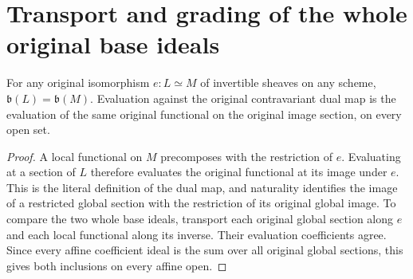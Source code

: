 \section{Transport and grading of the whole original base ideals}

\begin{lemma}
\label{lem:actual-base-ideal-iso-transport}
For any original isomorphism $e:L\simeq M$ of invertible sheaves on any
scheme, $\mathfrak b(L)=\mathfrak b(M)$. Evaluation against the original
contravariant dual map is the evaluation of the same original functional
on the original image section, on every open set.
\leanok
\end{lemma}
\begin{proof}
A local functional on $M$ precomposes with the restriction of $e$.
Evaluating at a section of $L$ therefore evaluates the original functional
at its image under $e$. This is the literal definition of the dual map,
and naturality identifies the image of a restricted global section with
the restriction of its original global image. To compare the two whole
base ideals, transport each original global section along $e$ and each
local functional along its inverse. Their evaluation coefficients agree.
Since every affine coefficient ideal is the sum over all original global
sections, this gives both inclusions on every affine open.
\end{proof}
